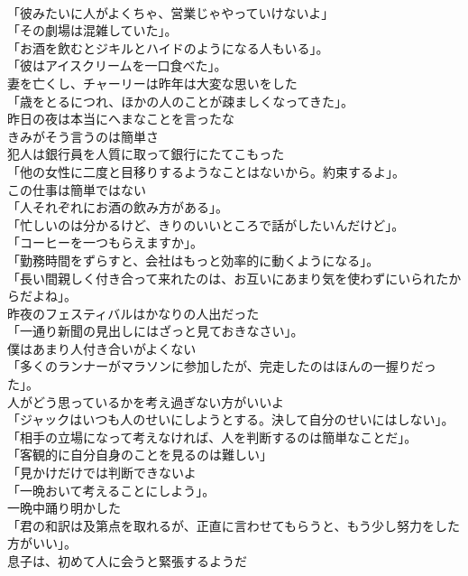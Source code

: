 \documentclass[8pt]{extreport}
\begin{document}
\begin{CJK}{UTF8}{min}
\\	「彼みたいに人がよくちゃ、営業じゃやっていけないよ」	
\\	「その劇場は混雑していた」。	
\\	「お酒を飲むとジキルとハイドのようになる人もいる」。	
\\	「彼はアイスクリームを一口食べた」。	
\\	妻を亡くし、チャーリーは昨年は大変な思いをした	
\\	「歳をとるにつれ、ほかの人のことが疎ましくなってきた」。	
\\	昨日の夜は本当にへまなことを言ったな	
\\	きみがそう言うのは簡単さ	
\\	犯人は銀行員を人質に取って銀行にたてこもった	
\\	「他の女性に二度と目移りするようなことはないから。約束するよ」。	
\\	この仕事は簡単ではない	
\\	「人それぞれにお酒の飲み方がある」。	
\\	「忙しいのは分かるけど、きりのいいところで話がしたいんだけど」。	
\\	「コーヒーを一つもらえますか」。	
\\	「勤務時間をずらすと、会社はもっと効率的に動くようになる」。	
\\	「長い間親しく付き合って来れたのは、お互いにあまり気を使わずにいられたからだよね」。	
\\	昨夜のフェスティバルはかなりの人出だった	
\\	「一通り新聞の見出しにはざっと見ておきなさい」。	
\\	僕はあまり人付き合いがよくない	
\\	「多くのランナーがマラソンに参加したが、完走したのはほんの一握りだった」。	
\\	人がどう思っているかを考え過ぎない方がいいよ	
\\	「ジャックはいつも人のせいにしようとする。決して自分のせいにはしない」。	
\\	「相手の立場になって考えなければ、人を判断するのは簡単なことだ」。	
\\	「客観的に自分自身のことを見るのは難しい」	
\\	「見かけだけでは判断できないよ	
\\	「一晩おいて考えることにしよう」。	
\\	一晩中踊り明かした	
\\	「君の和訳は及第点を取れるが、正直に言わせてもらうと、もう少し努力をした方がいい」。	
\\	息子は、初めて人に会うと緊張するようだ	

\end{CJK}
\end{document}
